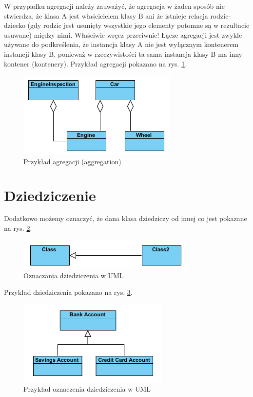 \documentclass[a4paper,11pt]{report}
\begin{document}
W przypadku agregacji należy zauważyć, że agregacja w żaden sposób nie stwierdza, 
że klasa A jest właścicielem klasy B ani że istnieje relacja rodzic-dziecko (gdy
rodzic jest usunięty wszystkie jego elementy potomne są w rezultacie usuwane) 
między nimi. Właściwie wręcz przeciwnie! Łącze agregacji jest zwykle używane
do podkreślenia, że instancja klasy A nie jest wyłącznym kontenerem instancji 
klasy B, ponieważ w rzeczywistości ta sama instancja klasy B ma inny kontener (kontenery).
Przykład agregacji pokazano na rys. \ref{fig:aggregation}.
\begin{figure}[H]
	\centering
	\includegraphics{figures/aggregation}
	\caption{Przykład agregacji (aggregation) \cite{association}}
	\label{fig:aggregation}
\end{figure}

\section{Dziedziczenie}

Dodatkowo możemy oznaczyć, że dana klasa dziedziczy od innej co jest pokazane
na rys. \ref{fig:inheritance}.
\begin{figure}[H]
	\centering
	\includegraphics{figures/inheritance}
	\caption{Oznaczania dziedziczenia w UML \cite{association}}
	\label{fig:inheritance}
\end{figure}
Przykład dziedziczenia pokazano na rys. \ref{fig:inheritanceExample}.
\begin{figure}[H]
	\centering
	\includegraphics{figures/inheritanceExample}
	\caption{Przykład oznaczenia dziedziczenia w UML \cite{association}}
	\label{fig:inheritanceExample}
\end{figure}
\end{document}
